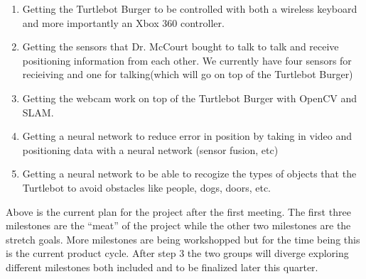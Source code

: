 \documentclass[12pt]{IEEEtran}
\begin{document}
\begin{enumerate}
    \item Getting the Turtlebot Burger to be controlled with both a wireless keyboard and more importantly an Xbox 360 controller.
    \item Getting the sensors that Dr. McCourt bought to talk to talk and receive positioning information from each other. We 
    currently have four sensors for recieiving and one for talking(which will go on top of the Turtlebot Burger)
    \item Getting the webcam work on top of the Turtlebot Burger with OpenCV and SLAM.
    \item Getting a neural network to reduce error in position by taking in video and positioning data with a neural network (sensor 
    fusion, etc)
    \item Getting a neural network to be able to recogize the types of objects that the Turtlebot to avoid obstacles like people, dogs, doors, etc.
\end{enumerate}
\noindent \indent Above is the current plan for the project after the first meeting. The first 
three milestones are the ``meat'' of the project while the other two milestones are the 
stretch goals. More milestones are being workshopped but for the time being this is the 
current product cycle. After step 3 the two groups will diverge exploring different milestones
both included and to be finalized later this quarter. 
\end{document}
